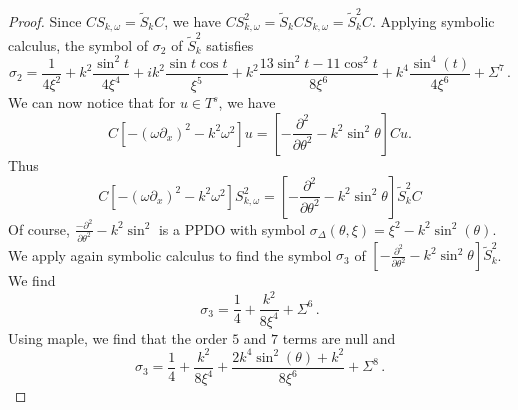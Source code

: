 \documentclass[a4paper]{article}
\begin{document}
\begin{proof}
	Since $CS_{k,\omega} = \tilde{S}_{k}C$, we have $CS_{k,\omega}^2 = \tilde{S}_{k}CS_{k,\omega} = \tilde{S}_{k}^2C$. Applying symbolic calculus, the symbol of $\sigma_2$ of $\tilde{S}_k^2$ satisfies
	\[\sigma_2 = \frac{1}{4\xi^2} + k^2\frac{\sin^2 t}{4 \xi^4} + i k^2 \frac{\sin t \cos t}{\xi^5} + k^2 \frac{13\sin^2 t - 11 \cos^2 t}{8\xi^6} + k^4\frac{ \sin^4(t)}{4\xi^6} + \Sigma^7\,.\]
	We can now notice that for $u \in T^s$, we have \[C\left[-(\omega \partial_x)^2 - k^2 \omega^2\right] u  = \left[-\frac{\partial^2}{\partial \theta^2} - k^2 \sin^2\theta\right]Cu.\]
	Thus 
	\[C\left[-(\omega \partial_x)^2 - k^2 \omega^2 \right]S_{k,\omega}^2 = \left[-\frac{\partial^2}{\partial \theta^2} - k^2 \sin^2\theta\right] \tilde{S}_k^2 C\]
	Of course, $\frac{-\partial^2}{\partial \theta^2} - k^2 \sin^2$ is a PPDO with symbol $\sigma_\Delta(\theta,\xi) = \xi^2 - k^2 \sin^2(\theta)$. We apply again symbolic calculus to find the symbol $\sigma_3$ of $\left[-\frac{\partial^2}{\partial \theta^2} - k^2 \sin^2\theta\right] \tilde{S}_k^2$. We find
	\[\sigma_3 = \frac{1}{4} + \frac{k^2}{8\xi^4} + \Sigma^6\,.\]
	Using maple, we find that the order $5$ and $7$ terms are null and 
	\[\sigma_3 = \frac{1}{4} + \frac{k^2}{8 \xi^4} + \frac{2k^4 \sin^2(\theta) + k^2}{8\xi^6} + \Sigma^8\,.\]
\end{proof}
\end{document}
